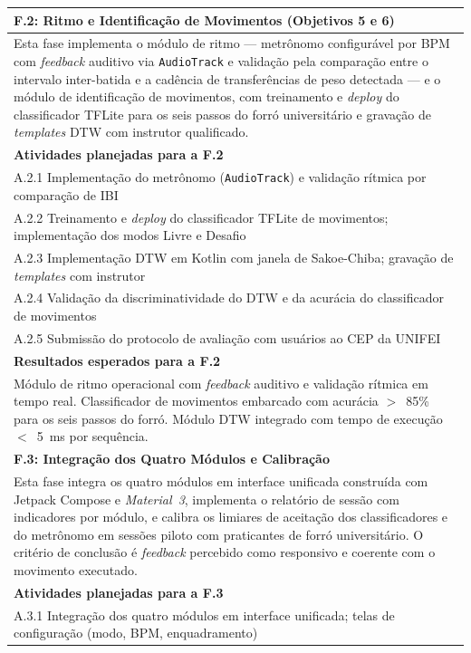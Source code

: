 \begin{longtable}{p{\textwidth}}
\toprule%
\myrowcolour%
\bfseries F.2: Ritmo e Identificação de Movimentos (Objetivos 5 e 6) \\
\midrule
Esta fase implementa o módulo de ritmo --- metrônomo configurável por BPM com
\textit{feedback} auditivo via \texttt{AudioTrack} e validação pela comparação entre o
intervalo inter-batida e a cadência de transferências de peso detectada --- e o módulo de
identificação de movimentos, com treinamento e \textit{deploy} do classificador TFLite para
os seis passos do forró universitário e gravação de \textit{templates} DTW com instrutor
qualificado.
\\
\midrule
\myrowcolour%
\bfseries Atividades planejadas para a F.2 \\
\midrule
A.2.1 Implementação do metrônomo (\texttt{AudioTrack}) e validação rítmica por comparação de IBI \\
A.2.2 Treinamento e \textit{deploy} do classificador TFLite de movimentos; implementação dos modos Livre e Desafio \\
A.2.3 Implementação DTW em Kotlin com janela de Sakoe-Chiba; gravação de \textit{templates} com instrutor \\
A.2.4 Validação da discriminatividade do DTW e da acurácia do classificador de movimentos \\
A.2.5 Submissão do protocolo de avaliação com usuários ao CEP da UNIFEI \\
\midrule
\myrowcolour%
\bfseries Resultados esperados para a F.2 \\
\midrule
Módulo de ritmo operacional com \textit{feedback} auditivo e validação rítmica em tempo real.
Classificador de movimentos embarcado com acurácia $>$~85\% para os seis passos do forró.
Módulo DTW integrado com tempo de execução $<$~5~ms por sequência. \\
\toprule%
\myrowcolour%
\bfseries F.3: Integração dos Quatro Módulos e Calibração \\
\midrule
Esta fase integra os quatro módulos em interface unificada construída com Jetpack Compose e
\textit{Material~3}, implementa o relatório de sessão com indicadores por módulo, e calibra
os limiares de aceitação dos classificadores e do metrônomo em sessões piloto com praticantes
de forró universitário. O critério de conclusão é \textit{feedback} percebido como responsivo
e coerente com o movimento executado.
\\
\midrule
\myrowcolour%
\bfseries Atividades planejadas para a F.3 \\
\midrule
A.3.1 Integração dos quatro módulos em interface unificada; telas de configuração (modo, BPM, enquadramento) \\

\end{longtable}
